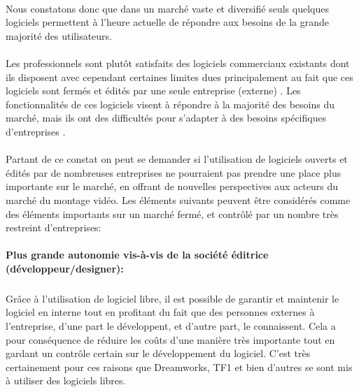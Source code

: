 \paragraph { }

Nous constatons donc que dans un marché vaste et diversifié
seuls quelques logiciels permettent à l'heure actuelle de répondre
aux besoins de la grande majorité des utilisateurs.

\paragraph{}

Les professionnels sont plutôt satisfaits des logiciels commerciaux
existants dont ils disposent avec cependant certaines limites dues
principalement au fait que ces logiciels sont fermés et édités par
une seule entreprise (externe) . Les fonctionnalités de ces logiciels visent à
répondre à la majorité des besoins du marché, mais ils ont des
difficultés pour s'adapter à des besoins spécifiques d'entreprises .

\paragraph{}

Partant de ce constat on peut se demander si l'utilisation de logiciels
ouverts et édités par de nombreuses entreprises ne pourraient pas
prendre une place plus importante sur le marché, en offrant de nouvelles
perspectives aux acteurs du marché du montage vidéo. Les éléments
suivants peuvent être considérés comme des éléments importants sur un
marché fermé, et contrôlé par un nombre très restreint d'entreprises:

\paragraph{Plus grande autonomie vis-à-vis de la société éditrice
(développeur/designer):}

  \subparagraph{ }

    Grâce à l'utilisation de logiciel libre, il est possible de garantir
    et maintenir le logiciel en interne tout en profitant du fait que
    des personnes externes à l'entreprise, d'une part le développent,
    et d'autre part, le connaissent. Cela a pour conséquence de réduire les coûts
    d'une manière très importante tout en gardant un contrôle
    certain sur le développement du logiciel. C'est très certainement pour
    ces raisons que Dreamworks, TF1 et bien d'autres se sont mis à utiliser
    des logiciels libres.

